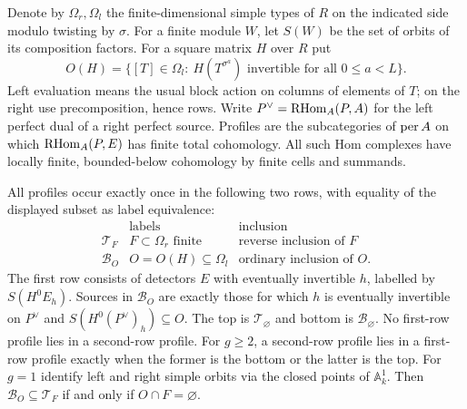 \documentclass[11pt]{article}
\begin{document}
Denote by $\Omega_r,\Omega_l$ the finite-dimensional simple types of
$R$ on the indicated side modulo twisting by $\sigma$. For a finite
module $W$, let $S(W)$ be the set of orbits of its composition factors.
For a square matrix $H$ over $R$ put
\[
 O(H)=\{[T]\in\Omega_l:\ H(T^{\sigma^a})\text{ invertible for all }
 0\le a<L\}.
\]
Left evaluation means the usual block action on columns of elements of
$T$; on the right use precomposition, hence rows. Write $P^\vee=\operatorname{RHom}_A(P,A)$
for the left perfect dual of a right perfect source. Profiles are the
subcategories of $\operatorname{per} A$ on which $\operatorname{RHom}_A(P,E)$ has finite total
cohomology. All such Hom complexes have locally finite, bounded-below
cohomology by finite cells and summands.

\begin{thm}\label{main}
All profiles occur exactly once in the following two rows, with equality
of the displayed subset as label equivalence:
\[
 \begin{array}{c|c|c}
  &\text{labels}&\text{inclusion}\\ \hline
 \mathcal T_F& F\subset\Omega_r\text{ finite} &\text{reverse inclusion of }F\\
 \mathcal B_O& O=O(H)\subseteq\Omega_l &\text{ordinary inclusion of }O .
 \end{array}
\]
The first row consists of detectors $E$ with eventually invertible $h$,
labelled by $S(H^0E_h)$. Sources in $\mathcal B_O$ are exactly those for
which $h$ is eventually invertible on $P^\vee$ and $S(H^0(P^\vee)_h)
\subseteq O$. The top is $\mathcal T_\varnothing$ and bottom is
$\mathcal B_\varnothing$. No first-row profile lies in a second-row profile.
For $g\ge2$, a second-row profile lies in a first-row profile exactly
when the former is the bottom or the latter is the top. For $g=1$
identify left and right simple orbits via the closed points of
$\mathbb A^1_k$. Then $\mathcal B_O\subseteq\mathcal T_F$ if and only if
$O\cap F=\varnothing$.
\end{thm}
\end{document}
